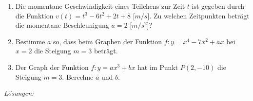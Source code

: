 \begin{ueb}
\begin{enumerate}
		\item Die momentane Geschwindigkeit eines Teilchens zur Zeit $t$ ist gegeben durch die Funktion \( v(t) = t^3 - 6t^2 + 2t + 8 \) [$m/s$]. Zu welchen Zeitpunkten beträgt die momentane Beschleunigung \( a = 2 \) [$m/s^2$]?

		\item Bestimme \( a \) so, dass beim Graphen der Funktion \( f \colon y = x^4 - 7x^2 + ax \) bei \( x = 2 \) die Steigung \( m = 3 \) beträgt.

		\item Der Graph der Funktion \( f \colon y = ax^3 + bx \) hat im Punkt \( P(2, -10) \) die Steigung \( m = 3 \). Berechne \( a \) und \( b \).

	\end{enumerate}





\end{ueb}

\clearpage
\emph{Lösungen:}

